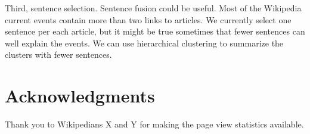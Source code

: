 \documentclass[11pt]{article}
\begin{document}
Third, sentence selection. Sentence fusion could be useful. Most of the Wikipedia current events 
contain more than two links to articles. We currently select one sentence per each article,
but it might be true sometimes that fewer sentences can well explain the events.
We can use hierarchical clustering to summarize the clusters with fewer sentences.

\section*{Acknowledgments}


Thank you to Wikipedians X and Y for making the page view statistics available.



\end{document}
